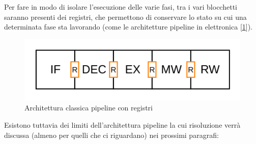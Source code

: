 Per fare in modo di isolare l'esecuzione delle varie fasi, tra i vari blocchetti saranno presenti dei registri, che permettono di conservare lo stato su cui una determinata fase sta lavorando (come le architetture pipeline in elettronica [\ref{img:pipe-reg}]). 

\begin{figure}[ht]
    \centering
    \includegraphics[width=.5\textwidth]{img/Pipe-reg.png}
    \caption{Architettura classica pipeline con registri}\label{img:pipe-reg}
\end{figure}

Esistono tuttavia dei limiti dell'architettura pipeline la cui risoluzione verrà discussa (almeno per quelli che ci riguardano) nei prossimi paragrafi:

